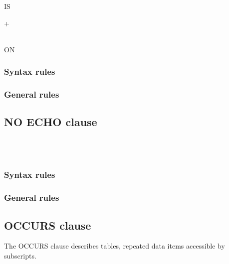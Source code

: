 \begin{syntax}
    IS
  \begin{1=}
    \begin{0-1}
      + \\
    \end{0-1}
    \integer \\
    ON  
  \end{1=}
\end{syntax}

\subsubsection{Syntax rules}

\subsubsection{General rules}

\subsection{NO ECHO clause}

\begin{syntax}[\miscextcolour]
  \begin{1=}
      \\
     \\
  \end{1=}
\end{syntax}

\subsubsection{Syntax rules}

\subsubsection{General rules}

\subsection{OCCURS clause}

The OCCURS clause describes tables, repeated data items accessible by subscripts.


